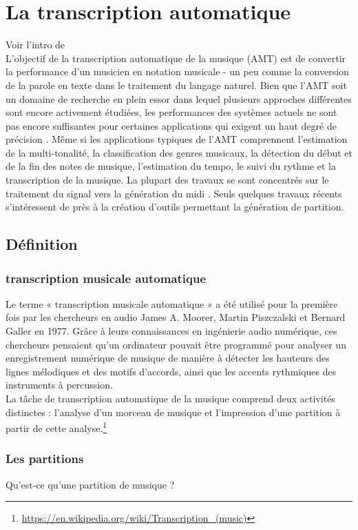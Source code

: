 \section{La transcription automatique}
Voir l’intro de \cite{article1}\\
L'objectif de la transcription automatique de la musique (AMT) \cite{article1} est de convertir la performance d'un musicien en notation musicale - un peu comme la conversion de la parole en texte dans le traitement du langage naturel. Bien que l’AMT soit un domaine de recherche en plein essor dans lequel plusieurs approches différentes sont encore activement étudiées, les performances des systèmes actuels ne sont pas encore suffisantes pour certaines applications qui exigent un haut degré de précision \cite{article1}. Même si les applications typiques de l'AMT comprennent l'estimation de la multi-tonalité, la classification des genres musicaux, la détection du début et de la fin des notes de musique, l'estimation du tempo, le suivi du rythme et la transcription de la musique. La plupart des travaux se sont concentrés sur le traitement du signal vers la génération du midi \cite{article2}. Seuls quelques travaux récents \cite{foscarin:hal-01988990} s’intéressent de près à la création d’outils permettant la génération de partition.
\subsection*{Définition}
\subsubsection{transcription musicale automatique}
Le terme « transcription musicale automatique » a été utilisé pour la première fois par les chercheurs en audio James A. Moorer, Martin Piszczalski et Bernard Galler en 1977. Grâce à leurs connaissances en ingénierie audio numérique, ces chercheurs pensaient qu'un ordinateur pouvait être programmé pour analyser un enregistrement numérique de musique de manière à détecter les hauteurs des lignes mélodiques et des motifs d'accords, ainsi que les accents rythmiques des instruments à percussion.\\La tâche de transcription automatique de la musique comprend deux activités distinctes : l'analyse d'un morceau de musique et l'impression d'une partition à partir de cette analyse.\footnote{\url{https://en.wikipedia.org/wiki/Transcription_(music)}}
\subsubsection{Les partitions}
Qu’est-ce qu’une partition de musique ?
